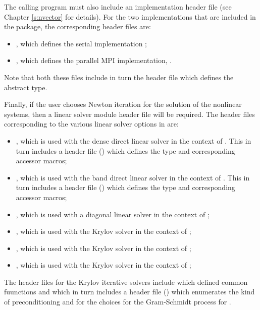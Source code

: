 The calling program must also include an {\nvector} implementation header file
(see Chapter \ref{s:nvector} for details).
For the two {\nvector} implementations that are included in the {\cvode} package,
the corresponding header files are:
\begin{itemize}
\item {}, 
  which defines the serial implementation {\nvecs};
\item {}, 
  which defines the parallel MPI implementation, {\nvecp}.
\end{itemize}
Note that both these files include in turn the header file  which 
defines the abstract  type. 

Finally, if the user chooses Newton iteration for the solution of the nonlinear
systems, then a linear solver module header file will be required. 
The header files corresponding to the various linear solver options in
{\cvode} are:
\begin{itemize}
\item {}, 
  which is used with the dense direct linear solver in 
  the context of {\cvode}. This in turn includes a header file ()
  which defines the  type and corresponding accessor macros; 
\item {}, 
  which is used with the band direct linear solver in the
  context of {\cvode}. This in turn includes a header file ()
  which defines the  type and corresponding accessor macros;
\item {}, which is used with a diagonal linear solver in the
  context of {\cvode};
\item {}, 
  which is used with the Krylov solver {\spgmr} in the
  context of {\cvode};
\item {}, 
  which is used with the Krylov solver {\spbcg} in the
  context of {\cvode};
\item {}, 
  which is used with the Krylov solver {\sptfqmr} in the
  context of {\cvode};
\end{itemize}

The header files for the Krylov iterative solvers include 
which defined common fuunctions and which in turn includes a header file ()
which enumerates the kind of preconditioning and for the choices for the Gram-Schmidt process for {\spgmr}.

